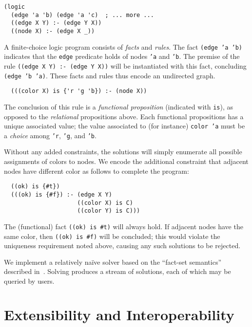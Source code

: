 \documentclass[dvipsnames,sigplan,screen,review,anonymous,acmthm,nonacm]{acmart}
\begin{document}
\begin{verbatim}
(logic
  (edge 'a 'b) (edge 'a 'c)  ; ... more ...
  ((edge X Y) :- (edge Y X))
  ((node X) :- (edge X _))
\end{verbatim}
A finite-choice logic program consists of \emph{facts} and \emph{rules}.
The fact \texttt{(edge 'a 'b)} indicates that the \texttt{edge} predicate
holds of nodes \texttt{'a} and \texttt{'b}.
The premise of the rule \texttt{((edge X Y) :- (edge Y X))} will be
instantiated with this fact, concluding \texttt{(edge 'b 'a)}.
These facts and rules thus encode an undirected graph.

\begin{verbatim}
  (((color X) is {'r 'g 'b}) :- (node X))
\end{verbatim}
The conclusion of this rule is a \emph{functional proposition}
(indicated with \texttt{is}), as opposed to the \emph{relational} propositions above.
Each functional propositions has a unique associated value;
the value associated to (for instance) \texttt{color 'a} must
be a \emph{choice} among \texttt{'r}, \texttt{'g}, and \texttt{'b}.

Without any added constraints, the solutions will simply enumerate all
possible assignments of colors to nodes. We encode the additional constraint
that adjacent nodes have different color as follows to complete the program:

\begin{verbatim}
  ((ok) is {#t})
  (((ok) is {#f}) :- (edge X Y)
                     ((color X) is C)
                     ((color Y) is C)))
\end{verbatim}
The (functional) fact \texttt{((ok) is {\#t})} will always hold.
If adjacent nodes have the same color, then \texttt{((ok) is {\#f})}
will be concluded; this would violate the uniqueness requirement noted
above, causing any such solutions to be rejected.

We implement a relatively naïve solver based on the ``fact-set semantics''
described in~\cite{martens2025dusa}. Solving produces a stream of solutions,
each of which may be queried by users.

\section{Extensibility and Interoperability}
\end{document}

